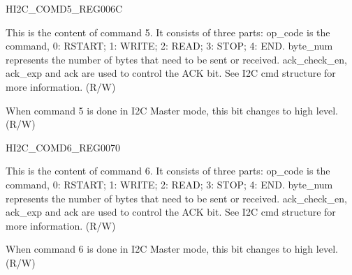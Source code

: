 \begin{register}{H}{I2C\_COMD5\_REG}{\hexprefix{}006C}\label{regdesc:I2CCOMD5REG}
%
%
%
\regnewline%
\begin{regdesc}\begin{reglist}
\label{fielddesc:I2CCOMMAND5}\item [I2C\_COMMAND5] This is the content of command 5. It consists of three parts:
op\_code is the command, 0: RSTART; 1: WRITE; 2: READ; 3: STOP; 4: END.
byte\_num represents the number of bytes that need to be sent or received.
ack\_check\_en, ack\_exp and ack are used to control the ACK bit. See I2C cmd structure for more information. (R/W)
\label{fielddesc:I2CCOMMAND5DONE}\item [I2C\_COMMAND5\_DONE] When command 5 is done in I2C Master mode, this bit changes to high level. (R/W)
\end{reglist}\end{regdesc}
\end{register}


\begin{register}{H}{I2C\_COMD6\_REG}{\hexprefix{}0070}\label{regdesc:I2CCOMD6REG}
%
%
%
\regnewline%
\begin{regdesc}\begin{reglist}
\label{fielddesc:I2CCOMMAND6}\item [I2C\_COMMAND6] This is the content of command 6. It consists of three parts:
op\_code is the command, 0: RSTART; 1: WRITE; 2: READ; 3: STOP; 4: END.
byte\_num represents the number of bytes that need to be sent or received.
ack\_check\_en, ack\_exp and ack are used to control the ACK bit. See I2C cmd structure for more information. (R/W)
\label{fielddesc:I2CCOMMAND6DONE}\item [I2C\_COMMAND6\_DONE] When command 6 is done in I2C Master mode, this bit changes to high level. (R/W)
\end{reglist}\end{regdesc}
\end{register}


